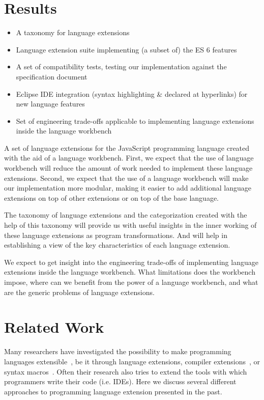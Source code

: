 \section{Results}
\begin{itemize}
	\item A taxonomy for language extensions
	\item Language extension suite implementing (a subset of) the ES 6 features
	\item A set of compatibility tests, testing our implementation against the specification document
	\item Eclipse IDE integration (syntax highlighting \& declared at hyperlinks) for new language features
	\item Set of engineering trade-offs applicable to implementing language extensions inside the language workbench
\end{itemize}

A set of language extensions for the JavaScript programming language created with the aid of a language workbench. First, we expect that the use of language workbench will reduce the amount of work needed to implement these language extensions. Second, we expect that the use of a language workbench will make our implementation more modular, making it easier to add additional language extensions on top of other extensions or on top of the base language. 

The taxonomy of language extensions and the categorization created with the help of this taxonomy will provide us with useful insights in the inner working of these language extensions as program transformations. And will help in establishing a view of the key characteristics of each language extension.

We expect to get insight into the engineering trade-offs of implementing language extensions inside the language workbench. What limitations does the workbench impose, where can we benefit from the power of a language workbench, and what are the generic problems of language extensions.

\section{Related Work} \label{sec:related}
Many researchers have investigated the possibility to make programming languages extensible~\cite{Erdweg2014a,Bravenboer2004}, be it through language extensions, compiler extensions~\cite{Zenger2001,Nystrom2003}, or syntax macros~\cite{Disney2014,Kohlbecker1986,Leavenworth1966,Weise1993}. Often their research also tries to extend the tools with which programmers write their code (i.e. IDEs). Here we discuss several different approaches to programming language extension presented in the past.

